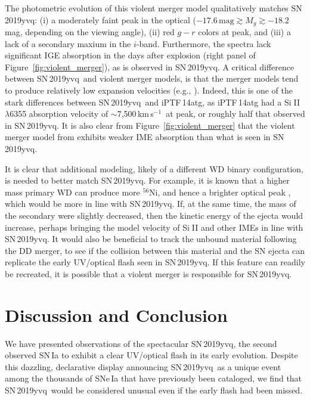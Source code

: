 \documentclass[twocolumn]{aastex63}
\def\ion#1#2{#1$\;${\footnotesize\rm{#2}}\relax}
\newcommand{\aam}[1]{{\color{DarkOrange} aam: \textbf{#1}}}
\newcommand{\kms}{km\,s$^{-1}$}
\newcommand{\radni}{$^{56}$Ni}
\newcommand{\sn}{SN\,2019yvq}
\begin{document}
The photometric evolution of this violent merger model qualitatively matches
\sn: (i) a moderately faint peak in the optical ($-17.6\,\mathrm{mag} \gtrsim
M_g \gtrsim -18.2$\,mag, depending on the viewing angle), (ii) red $g - r$
colors at peak, and (iii) a lack of a secondary maxium in the $i$-band.
Furthermore, the spectra lack significant IGE absorption in the days after
explosion (right panel of Figure~\ref{fig:violent_merger}), as is observed in
\sn. A critical difference between \sn\ and violent merger models, is that the
merger models tend to produce relatively low expansion velocities (e.g.,
\citealt{Pakmor10,Kromer13a,Kromer16}). Indeed, this is one of the stark
differences between \sn\ and iPTF\,14atg, as iPTF\,14atg had a \ion{Si}{II}
$\lambda$6355 absorption velocity of $\sim$7,500\,\kms\ at peak, or roughly
half that observed in \sn. It is also clear from
Figure~\ref{fig:violent_merger} that the violent merger model from
\citet{Kromer16} exhibits weaker IME absorption than what is seen in \sn.

It is clear that additional modeling, likely of a different WD binary
configuration, is needed to better match \sn. For example, it is known that a
higher mass primary WD can produce more \radni, and hence a brighter optical
peak \citep[e.g.,][]{Pakmor12}, which would be more in line with \sn. If, at
the same time, the mass of the secondary were slightly decreased, then the
kinetic energy of the ejecta would increase, perhaps bringing the model
velocity of \ion{Si}{II} and other IMEs in line with \sn. It would also be
beneficial to track the unbound material following the DD merger, to see if
the collision between this material and the SN ejecta can replicate the early
UV/optical flash seen in \sn. If this feature can readily be recreated, it is
possible that a violent merger is responsible for \sn.

%
%

\section{Discussion and Conclusion}\label{sec:conclusions}

We have presented observations of the spectacular \sn, the second observed
SN\,Ia to exhibit a clear UV/optical flash in its early evolution. Despite
this dazzling, declarative display announcing \sn\ as a unique event among the
thousands of SNe\,Ia that have previously been cataloged, we find that \sn\
would be considered unusual even if the early flash had been missed.
\end{document}
